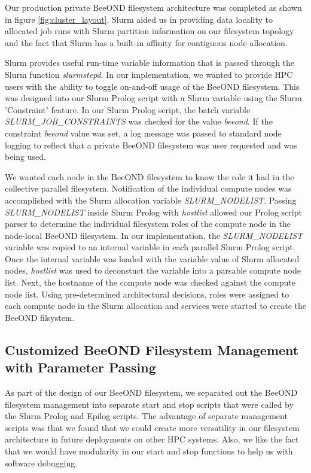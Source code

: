 Our production private BeeOND filesystem  architecture was completed as shown in figure \ref{fig:cluster_layout}.  Slurm aided us in providing data locality to allocated job runs with Slurm partition information on our filesystem topology and the fact that Slurm has a built-in affinity for contiguous node allocation. 

Slurm provides useful run-time variable information that is passed through the Slurm function \textit {slurmstepd}.  In our implementation, we wanted to provide HPC users with the ability to toggle on-and-off usage of the BeeOND filesystem.  This was designed into our Slurm Prolog script with a Slurm variable using the Slurm 'Constraint' feature.  In our Slurm Prolog script, the batch variable \textit{SLURM\_JOB\_CONSTRAINTS} was checked for the value \textit{beeond}. If the constraint \textit{beeond} value was set, a log message was passed to standard node logging to reflect that a private BeeOND filesystem was user requested and was being used. 

We wanted each node in the BeeOND filesystem to know the role it had in the collective parallel filesystem.  Notification of the individual compute nodes was accomplished with the Slurm allocation variable \textit {SLURM\_NODELIST}. Passing \textit {SLURM\_NODELIST} inside Slurm Prolog with \textit{hostlist} allowed our Prolog script parser to determine the individual filesystem roles of the compute node in the node-local BeeOND filesystem. In our implementation, the \textit {SLURM\_NODELIST} variable was copied to an internal variable in each parallel Slurm Prolog script.  Once the internal variable was loaded with the variable value of Slurm allocated nodes, \textit {hostlist} was used to deconstuct the variable into a parsable compute node list.  Next, the hostname of the compute node was checked against the compute node list.  Using pre-determined architectural decisions, roles were assigned to each compute node in the Slurm allocation and services were started to create the BeeOND filsystem.

\subsection{Customized BeeOND Filesystem Management with Parameter Passing}

As part of the design of our BeeOND filesystem, we separated out the BeeOND filesystem management into separate start and stop scripts that were called by the Slurm Prolog and Epilog scripts.  The advantage of separate  management scripts was that we found that we could create more versatility in our filesystem architecture in future deployments on other HPC systems.  Also, we like the fact that we would have modularity in our start and stop functions to help us with software debugging.  

